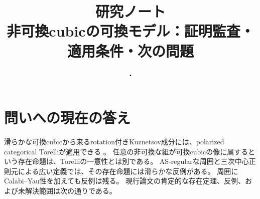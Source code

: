 
\title{研究ノート\\\large 非可換cubicの可換モデル：証明監査・適用条件・次の問題}
\author{}
\date{\DocDate・\DocVersion}

\maketitle
\tableofcontents

\section{問いへの現在の答え}

滑らかな可換cubicから来るrotation付きKuznetsov成分には、polarized categorical
Torelliが適用できる \cite[Theorem 1.7]{LZ}。
任意の非可換な組が可換cubicの像に属するという存在命題は、Torelliの一意性とは別である。
AS-regularな周囲と三次中心正則元による広い定義では、その存在命題には滑らかな反例がある。
周囲にCalabi--Yau性を加えても反例は残る。
現行論文の肯定的な存在定理、反例、および未解決範囲は次の通りである。

